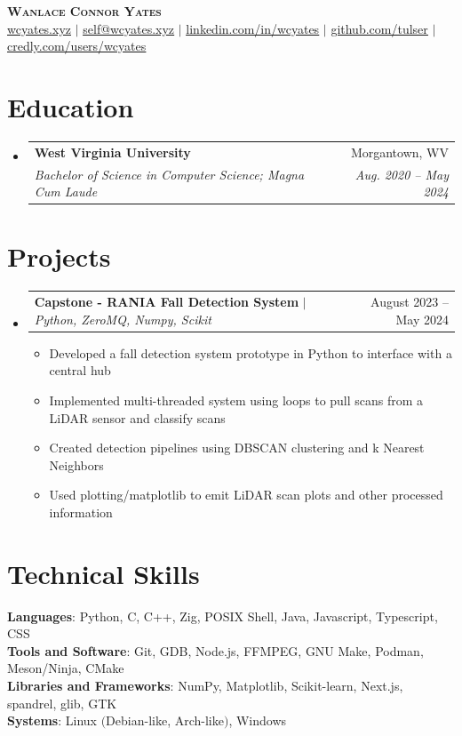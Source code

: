 \documentclass[letterpaper,11pt]{article}
\makeatletter
\newcommand{\resumeItem}[1]{
  \item\small{
    {#1 \vspace{-2pt}}
  }
}
\newcommand{\resumeSubheading}[4]{
  \vspace{-2pt}\item
    \begin{tabular*}{0.97\textwidth}[t]{l@{\extracolsep{\fill}}r}
      \textbf{#1} & #2 \\
      \textit{\small#3} & \textit{\small #4} \\
    \end{tabular*}\vspace{-7pt}
}
\newcommand{\resumeProjectHeading}[2]{
    \item
    \begin{tabular*}{0.97\textwidth}{l@{\extracolsep{\fill}}r}
      \small#1 & #2 \\
    \end{tabular*}\vspace{-7pt}
}
\newcommand{\resumeSubHeadingListStart}{\begin{itemize}[leftmargin=0.15in, label={}]}
\newcommand{\resumeSubHeadingListEnd}{\end{itemize}}
\newcommand{\resumeItemListStart}{\begin{itemize}}
\newcommand{\resumeItemListEnd}{\end{itemize}\vspace{-5pt}}
\makeatother
\begin{document}
\begin{center}
    \textbf{\Huge \scshape Wanlace Connor Yates} \\ \vspace{1pt}
    \small 
    \href{https://wcyates.xyz}{\underline{wcyates.xyz}} $|$ 
    \href{mailto:self@wcyates.xyz}{\underline{self@wcyates.xyz}} $|$ 
    \href{https://www.linkedin.com/in/wcyates/}{\underline{linkedin.com/in/wcyates}} $|$
    \href{https://github.com/tulser/}{\underline{github.com/tulser}} $|$
    \href{https://www.credly.com/users/wcyates}{\underline{credly.com/users/wcyates}}
\end{center}


\section{Education}
  \resumeSubHeadingListStart
    \resumeSubheading
      {West Virginia University}{Morgantown, WV}
      {Bachelor of Science in Computer Science; Magna Cum Laude}{Aug. 2020 -- May 2024}
  \resumeSubHeadingListEnd


\section{Projects}
    \resumeSubHeadingListStart
      \resumeProjectHeading
          {\textbf{Capstone - RANIA Fall Detection System} $|$ \emph{Python, ZeroMQ, Numpy, Scikit}}{August 2023 -- May 2024}
          \resumeItemListStart
            \resumeItem{Developed a fall detection system prototype in Python to interface with a central hub}
            \resumeItem{Implemented multi-threaded system using loops to pull scans from a LiDAR sensor and classify scans}
            \resumeItem{Created detection pipelines using DBSCAN clustering and k Nearest Neighbors}
            \resumeItem{Used plotting/matplotlib to emit LiDAR scan plots and other processed information}
          \resumeItemListEnd
    \resumeSubHeadingListEnd


\section{Technical Skills}
 \begin{itemize}[leftmargin=0.15in, label={}]
    \small{\item{
     \textbf{Languages}{: Python, C, C++, Zig, POSIX Shell, Java, Javascript, Typescript, CSS} \\
     \textbf{Tools and Software}{: Git, GDB, Node.js, FFMPEG, GNU Make, Podman, Meson/Ninja, CMake} \\
     \textbf{Libraries and Frameworks}{: NumPy, Matplotlib, Scikit-learn, Next.js, spandrel, glib, GTK} \\
     \textbf{Systems}{: Linux $($Debian-like, Arch-like$)$, Windows}
    }}
 \end{itemize}
\end{document}
